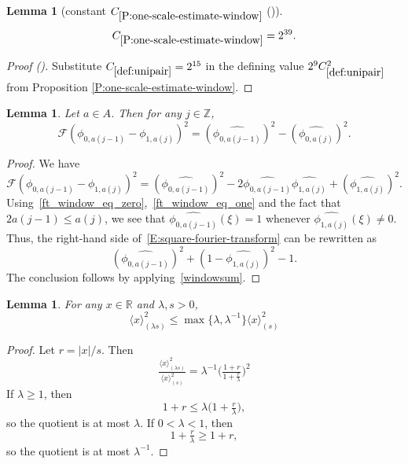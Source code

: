 \documentclass[12pt,reqno]{amsart}
\newcommand{\auto}{{({\tiny\faCar})}}
\theoremstyle{plain}
\newtheorem{lemma}[theorem]{Lemma}
\numberwithin{equation}{section}
\theoremstyle{remark}
\newcommand{\uses}[1]{}
\newcommand{\usesdefs}[1]{}
\newcommand{\Z}{{\mathbb Z}}
\newcommand{\R}{{\mathbb R}}
\begin{document}
\begin{lemma}[constant $C_{\ref{P:one-scale-estimate-window}}$ \auto]\label{auto:constant-one-scale-window}\uses{P:one-scale-estimate-window}\usesdefs{def:unipair}
\begin{equation}\label{auto:constant-one-scale-window-bound}
C_{\ref{P:one-scale-estimate-window}}=2^{39}.
\end{equation}
\end{lemma}
\begin{proof}[Proof \auto]
Substitute $C_{\ref{def:unipair}}=2^{15}$ in the defining value $2^9C_{\ref{def:unipair}}^2$ from Proposition \ref{P:one-scale-estimate-window}.
\end{proof}

\begin{lemma}\label{L:fourier-transform-window}\uses{}\usesdefs{multiplicatively spaced monotone sequences,def:cn-window,def:cpair,def:unipair,defn:window based bump functions}
Let $a\in A$. Then for any $j\in \Z$,
\begin{equation}\label{auto:window-square-Fourier-identity}
\mathcal F({\phi}_{0,a(j-1)}-{\phi}_{1,a(j)})^2=
(\widehat{{\phi}_{0,a(j-1)}})^2-(\widehat{{\phi}_{0,a(j)}})^2.
\end{equation}
\end{lemma}

\begin{proof}
We have
\begin{equation}\label{E:square-fourier-transform}
\mathcal F({\phi}_{0,a(j-1)}-{\phi}_{1,a(j)})^2=
(\widehat{{\phi}_{0,a(j-1)}})^2 - 2 \widehat{{\phi}_{0,a(j-1)}} \widehat{{\phi}_{1,a(j)}} +(\widehat{{\phi}_{1,a(j)}})^2.
\end{equation}
Using~\eqref{ft_window_eq_zero},~\eqref{ft_window_eq_one} and the fact that $2a(j-1) \leq a(j)$, we see that $\widehat{{\phi}_{0,a(j-1)}}(\xi)=1$ whenever $\widehat{{\phi}_{1,a(j)}}(\xi) \neq 0$. Thus, the right-hand side of~\eqref{E:square-fourier-transform} can be rewritten as
\[
(\widehat{{\phi}_{0,a(j-1)}})^2 +(1-\widehat{{\phi}_{1,a(j)}})^2-1.
\]
The conclusion follows by applying~\eqref{windowsum}.
\end{proof}

\begin{lemma} \label{lem:scaleest}\uses{}\usesdefs{bracket bump}
    For any $x\in \R$ and $\lambda, s>0$,
    \begin{equation}\label{auto:scaled-bracket-comparison}\langle x \rangle^2_{(\lambda s)} \le \max\{\lambda,\lambda^{-1}\}\langle x \rangle^2_{(s)}\end{equation}
\end{lemma}
\begin{proof}
    Let $r=|x|/s$. Then
    \[\tfrac{\langle x \rangle^2_{(\lambda s)} }{\langle x \rangle^2_{(s)}} = \lambda^{-1}\Big(\tfrac{1+r}{1+\tfrac{r}{\lambda}} \Big)^2\]
    If $\lambda\ge 1$, then
    \[1+r\le \lambda\Big(1+\tfrac{r}{\lambda} \Big),\]
    so the quotient is at most $\lambda$. If $0<\lambda <1$, then
    \[1+\tfrac{r}{\lambda}\ge 1+ r,\]
    so the quotient is at most $\lambda^{-1}$.
\end{proof}
\end{document}
